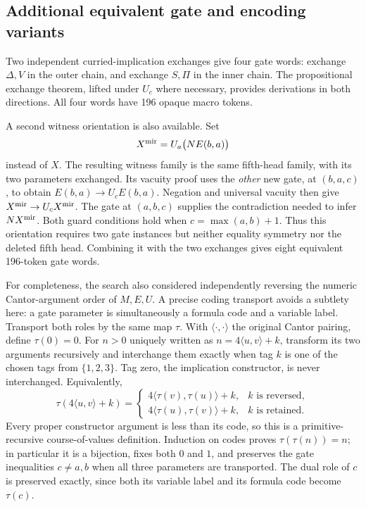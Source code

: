 \subsection{Additional equivalent gate and encoding variants}

Two independent curried-implication exchanges give four gate words: exchange
$\Delta,V$ in the outer chain, and exchange $S,\Pi$ in the inner chain.
The propositional exchange theorem, lifted under $U_c$ where necessary,
provides derivations in both directions.  All four words have 196 opaque
macro tokens.

A second witness orientation is also available.  Set
\[
 X^{\rm mir}=U_a\bigl(N E(b,a)\bigr)
\]
instead of $X$.  The resulting witness family is the same fifth-head family,
with its two parameters exchanged.  Its vacuity proof uses the \emph{other}
new gate, at $(b,a,c)$, to obtain
$E(b,a)\to U_cE(b,a)$.  Negation and universal vacuity then give
$X^{\rm mir}\to U_cX^{\rm mir}$.  The gate at $(a,b,c)$ supplies the
contradiction needed to infer $N X^{\rm mir}$.  Both guard conditions hold
when $c=\max(a,b)+1$.  Thus this orientation requires two gate instances but
neither equality symmetry nor the deleted fifth head.  Combining it with the
two exchanges gives eight equivalent 196-token gate words.

For completeness, the search also considered independently reversing the
numeric Cantor-argument order of $M,E,U$.  A precise coding transport avoids
a subtlety here: a gate parameter is simultaneously a formula code and a
variable label.  Transport both roles by the same map $\tau$.  With
$\langle\cdot,\cdot\rangle$ the original Cantor pairing, define
$\tau(0)=0$.  For $n>0$ uniquely written as
$n=4\langle u,v\rangle+k$, transform its two arguments recursively and
interchange them exactly when tag $k$ is one of the chosen tags from
$\{1,2,3\}$.  Tag zero, the implication constructor, is never interchanged.
Equivalently,
\[
 \tau(4\langle u,v\rangle+k)=
 \begin{cases}
 4\langle\tau(v),\tau(u)\rangle+k,&k\text{ is reversed},\\
 4\langle\tau(u),\tau(v)\rangle+k,&k\text{ is retained}.
 \end{cases}
\]
Every proper constructor argument is less than its code, so this is a
primitive-recursive course-of-values definition.  Induction on codes proves
$\tau(\tau(n))=n$; in particular it is a bijection, fixes both $0$ and $1$,
and preserves the gate inequalities $c\ne a,b$ when all three parameters are
transported.  The dual role of $c$ is preserved exactly, since both its
variable label and its formula code become $\tau(c)$.

